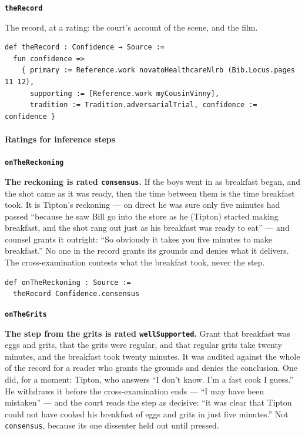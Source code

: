 \documentclass[11pt]{article}
\begin{document}
\par\medskip\noindent\textbf{\texttt{the\allowbreak{}Record}}\par\nobreak\noindent
The record, at a rating: the court’s account of the scene, and the film.

{\small\begin{verbatim}
def theRecord : Confidence → Source :=
  fun confidence =>
    { primary := Reference.work novatoHealthcareNlrb (Bib.Locus.pages 11 12),
      supporting := [Reference.work myCousinVinny],
      tradition := Tradition.adversarialTrial, confidence := confidence }
\end{verbatim}}
\paragraph*{Ratings for inference steps}
\leavevmode\par\nobreak
\par\medskip\noindent\textbf{\texttt{on\allowbreak{}The\allowbreak{}Reckoning}}\par\nobreak\noindent
\textbf{The reckoning is rated \texttt{consensus}.} If the boys went in as breakfast began, and the shot came as it was ready, then the time between them is the time breakfast took. It is Tipton’s reckoning — on direct he was sure only five minutes had passed “because he saw Bill go into the store as he (Tipton) started making breakfast, and the shot rang out just as his breakfast was ready to eat” — and counsel grants it outright: “So obviously it takes you five minutes to make breakfast.” No one in the record grants its grounds and denies what it delivers. The cross-examination contests what the breakfast took, never the step.

{\small\begin{verbatim}
def onTheReckoning : Source :=
  theRecord Confidence.consensus
\end{verbatim}}
\par\medskip\noindent\textbf{\texttt{on\allowbreak{}The\allowbreak{}Grits}}\par\nobreak\noindent
\textbf{The step from the grits is rated \texttt{well\allowbreak{}Supported}.} Grant that breakfast was eggs and grits, that the grits were regular, and that regular grits take twenty minutes, and the breakfast took twenty minutes. It was audited against the whole of the record for a reader who grants the grounds and denies the conclusion. One did, for a moment: Tipton, who answers “I don’t know. I’m a fast cook I guess.” He withdraws it before the cross-examination ends — “I may have been mistaken” — and the court reads the step as decisive: “it was clear that Tipton could not have cooked his breakfast of eggs and grits in just five minutes.” Not \texttt{consensus}, because its one dissenter held out until pressed.
\end{document}
